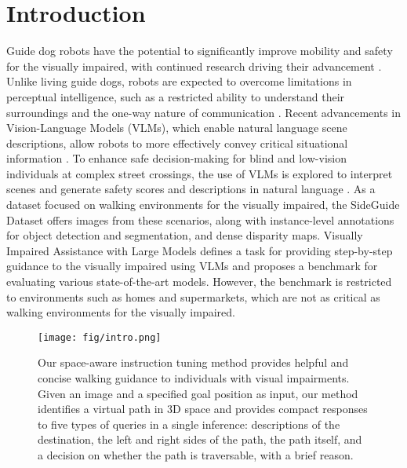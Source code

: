 \section{Introduction}
Guide dog robots have the potential to significantly improve mobility and safety for the visually impaired, with continued research driving their advancement \cite{wei2014guide}\cite{xiao2021robotic}\cite{hong2024collaborative}\cite{saegusa2010development}.
Unlike living guide dogs, robots are expected to overcome limitations in perceptual intelligence, such as a restricted ability to understand their surroundings and the one-way nature of communication \cite{Hochul2024}. 
Recent advancements in Vision-Language Models (VLMs), which enable natural language scene descriptions, allow robots to more effectively convey critical situational information \cite{chen2020uniter}\cite{alayrac2022flamingo}\cite{you2023ferret}\cite{li2023blip}.
To enhance safe decision-making for blind and low-vision individuals at complex street crossings, the use of VLMs is explored to interpret scenes and generate safety scores and descriptions in natural language \cite{hochul2024crossstreet}.
As a dataset focused on walking environments for the visually impaired, the SideGuide Dataset \cite{Kibaek2020} offers images from these scenarios, along with instance-level annotations for object detection and segmentation, and dense disparity maps.
Visually Impaired Assistance with Large Models \cite{zhao2024vialmsurveybenchmarkvisually} defines a task for providing step-by-step guidance to the visually impaired using VLMs and proposes a benchmark for evaluating various state-of-the-art models. 
However, the benchmark is restricted to environments such as homes and supermarkets, which are not as critical as walking environments for the visually impaired.

\begin{figure}[t]
    \centering
    \texttt{[image: fig/intro.png]} %
    \vspace{-15pt}
    \caption{Our space-aware instruction tuning method provides helpful and concise walking guidance to individuals with visual impairments.
   Given an image and a specified goal position as input, our method identifies a virtual path in 3D space and provides compact responses to five types of queries in a single inference: descriptions of the destination, the left and right sides of the path, the path itself, and a decision on whether the path is traversable, with a brief reason.    
   }
    \label{fig:intro}
    \vspace{-20pt}
\end{figure}

